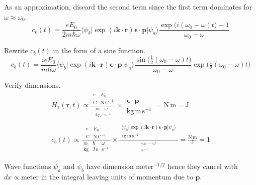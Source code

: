 As an approximation, discard the second term since the first term
dominates for $\omega\approx\omega_0$.
\begin{equation*}
c_b(t)=\frac{eE_0}{2m\hbar\omega}
\langle\psi_b|\exp(i\mathbf k\cdot\mathbf r)\boldsymbol{\epsilon}\cdot\mathbf p|\psi_a\rangle
\frac{\exp\bigl(i(\omega_0-\omega)t\bigr)-1}{\omega_0-\omega}
\end{equation*}

Rewrite $c_b(t)$ in the form of a sine function.
\begin{equation*}
c_b(t)=\frac{ieE_0}{m\hbar\omega}
\langle\psi_b|\exp(i\mathbf k\cdot\mathbf r)\boldsymbol{\epsilon}\cdot\mathbf p|\psi_a\rangle
\frac{\sin\bigl(\tfrac{1}{2}(\omega_0-\omega)t\bigr)}{\omega_0-\omega}
\exp\bigl(\tfrac{i}{2}(\omega_0-\omega)t\bigr)
\tag{2}
\end{equation*}

Verify dimensions.
\begin{gather*}
H_1(\mathbf r,t)
\propto\frac{
\begin{matrix}
e & E_0
\\
\text{C}
& \text{N}\,\text{C}^{-1}
\end{matrix}
}{
\begin{matrix}
m & \omega
\\
\text{kg} & \text{s}^{-1}
\end{matrix}
}
\times
\begin{matrix}
\\
\boldsymbol{\epsilon}\cdot\mathbf p
\\
\text{kg}\,\text{m}\,\text{s}^{-1}
\end{matrix}
=\text{N}\,\text{m}=\text{J}
\\ %
c_b(t)\propto\frac{
\begin{matrix}
e & E_0
\\
\text{C} & \text{N}\,\text{C}^{-1}
\end{matrix}
}{
\begin{matrix}
m & \hbar & \omega
\\
\text{kg} & \text{J}\,\text{s} & \text{s}^{-1}
\end{matrix}
}
\times
\frac{
\begin{matrix}
\\
\langle\psi_b|\exp(i\mathbf k\cdot\mathbf r)\boldsymbol{\epsilon}\cdot\mathbf p|\psi_a\rangle
\\
\text{kg}\,\text{m}\,\text{s}^{-1}
\end{matrix}
}{
\begin{matrix}
\omega_0-\omega
\\
\text{s}^{-1}
\end{matrix}
}
=\frac{\text{N}\,\text{m}}{\text{J}}=1
\end{gather*}

Wave functions $\psi_a$ and $\psi_b$ have dimension $\text{meter}^{-1/2}$
hence they cancel with $dx\propto\text{meter}$ in the integral leaving
units of momentum due to $\mathbf p$.


